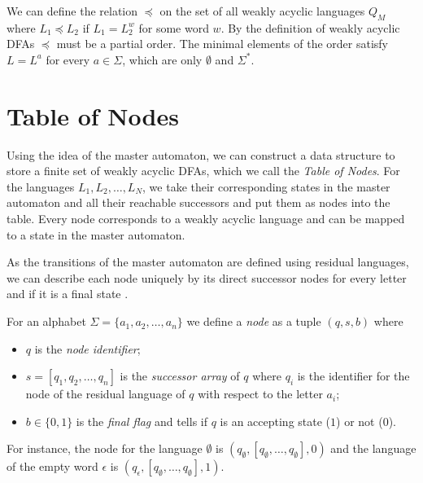 \par

We can define the relation $\preceq$ on the set of all weakly acyclic languages $Q_{M}$ where $L_{1} \preceq L_{2}$ if $L_{1} = L_{2}^{w}$ for some word $w$. By the definition of weakly acyclic DFAs $\preceq$ must be a partial order. The minimal elements of the order satisfy $L = L^{a}$ for every $a \in \Sigma$, which are only $\emptyset$ and $\Sigma^{*}$.



\section{Table of Nodes}
Using the idea of the master automaton, we can construct a data structure to store a finite set of weakly acyclic DFAs, which we call the \textit{Table of Nodes}. For the languages $L_{1},L_{2},\dots,L_{N}$, we take their corresponding states in the master automaton and all their reachable successors and put them as nodes into the table. Every node corresponds to a weakly acyclic language and can be mapped to a state in the master automaton.

\par 

As the transitions of the master automaton are defined using residual languages, we can describe each node uniquely by its direct successor nodes for every letter and if it is a final state \cite{blondin_24}.

\par

For an alphabet $\Sigma = \{a_{1}, a_{2},\dots,a_{n} \}$ we define a \emph{node} as a tuple $(q,s,b)$ where
\begin{itemize}[--,noitemsep]
\item $q$ is the \emph{node identifier};
\item $s = [q_{1},q_{2},\dots,q_{n}]$ is the \emph{successor array} of $q$ where $q_{i}$ is the identifier for the node of the residual language of $q$ with respect to the letter $a_{i}$;
\item $b \in \{0,1\}$ is the \emph{final flag} and tells if $q$ is an accepting state ($1$) or not ($0$).
\end{itemize}
For instance, the node for the language $\emptyset$ is $(q_{\emptyset},[q_{\emptyset},\dots,q_{\emptyset}],0)$ and the language of the empty word $\epsilon$ is $(q_{\epsilon},[q_{\emptyset},\dots,q_{\emptyset}],1)$.

